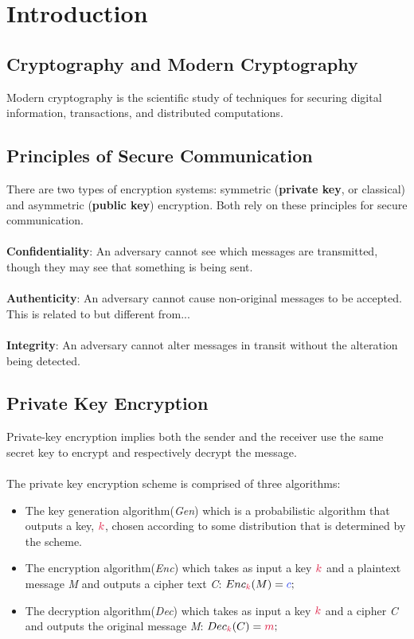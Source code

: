 \chapter{Introduction}
\section{Cryptography and Modern Cryptography}
    
    Modern cryptography is the scientific study of techniques for securing digital information, transactions, and distributed computations.
    
\section{Principles of Secure Communication}
    There are two types of encryption systems: symmetric (\textbf{private key}, or classical) and asymmetric (\textbf{public key}) encryption. Both rely on these principles for secure communication.\\
    \\
    \textbf{Confidentiality}: An adversary cannot see which messages are transmitted, though they may see that something is being sent.\\
    \\
    \textbf{Authenticity}: An adversary cannot cause non-original messages to be accepted. This is related to but different from...\\
    \\
    \textbf{Integrity}: An adversary cannot alter messages in transit without the alteration being detected.\\

\section{Private Key Encryption}

    Private-key encryption implies both the sender and the receiver use the same secret key to encrypt and respectively decrypt the message.\\
    \\
    The private key encryption scheme is comprised of three algorithms:
    
    \begin{itemize}
      \item The key generation algorithm(\textit{Gen}) which is a probabilistic algorithm that outputs a key, $\ck$, chosen according to some distribution that is determined by the scheme.
      \item The encryption algorithm(\textit{Enc}) which takes as input a key $\ck$ and a plaintext message \textit{M} and outputs a cipher text \textit{C}: $Enc_\ck(M) = \cc;$
      \item The decryption algorithm(\textit{Dec}) which takes as input a key $\ck$ and a cipher \textit{C} and outputs the original message \textit{M}: $Dec_\ck(C) = \cm;$
    \end{itemize}
    
